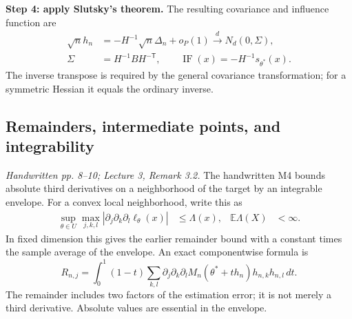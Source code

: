 \documentclass[12pt]{article}
\newcommand{\E}{\mathbb E}
\begin{document}
\textbf{Step 4: apply Slutsky's theorem.}
The resulting covariance and influence function are
\begin{align}
 \sqrt n h_n&=-H^{-1}\sqrt n\Delta_n+o_P(1)
 \xrightarrow{d}N_d(0,\Sigma),\\
 \Sigma&=H^{-1}BH^{-\mathsf T},\qquad
 \operatorname{IF}(x)=-H^{-1}s_{\theta^*}(x).
\end{align}
The inverse transpose is required by the general covariance transformation;
for a symmetric Hessian it equals the ordinary inverse.


\subsection{Remainders, intermediate points, and integrability}
\textit{Handwritten pp. 8--10; Lecture 3, Remark 3.2.}
The handwritten M4 bounds absolute third derivatives on a neighborhood
of the target by an integrable envelope. For a convex local neighborhood,
write this as
\begin{align}
 \sup_{\theta\in U}\max_{j,k,l}
 |\partial_j\partial_k\partial_l\ell_\theta(x)|&\le\Lambda(x),
 &\E\Lambda(X)&<\infty.
\end{align}
In fixed dimension this gives the earlier remainder bound with a constant
times the sample average of the envelope. An exact componentwise formula is
\begin{equation}
 R_{n,j}=\int_0^1(1-t)\sum_{k,l}
 \partial_j\partial_k\partial_l M_n(\theta^*+th_n)
 h_{n,k}h_{n,l}\,dt.
\end{equation}
The remainder includes two factors of the estimation error; it is not
merely a third derivative. Absolute values are essential in the envelope.
\end{document}
